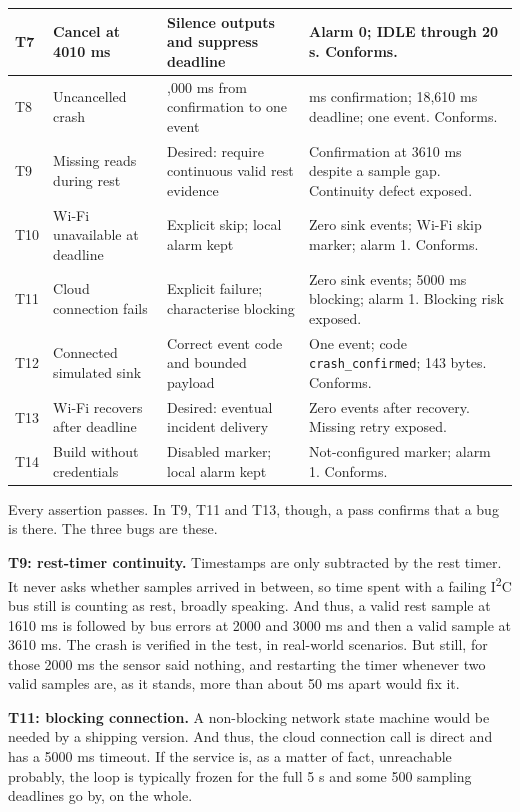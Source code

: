 \documentclass[10pt,a4paper]{article}
\begin{document}
\begin{longtable}{|>{\raggedright\arraybackslash}p{.05\linewidth}|>{\raggedright\arraybackslash}p{.21\linewidth}|>{\raggedright\arraybackslash}p{.28\linewidth}|>{\raggedright\arraybackslash}p{.35\linewidth}|}
T7 & Cancel at 4010 ms & Silence outputs and suppress deadline & Alarm 0; IDLE through 20 s. Conforms.\\\hline
T8 & Uncancelled crash & 15,000 ms from confirmation to one event & 3610 ms confirmation; 18,610 ms deadline; one event. Conforms.\\\hline
T9 & Missing reads during rest & Desired: require continuous valid rest evidence & Confirmation at 3610 ms despite a sample gap. Continuity defect exposed.\\\hline
T10 & Wi-Fi unavailable at deadline & Explicit skip; local alarm kept & Zero sink events; Wi-Fi skip marker; alarm 1. Conforms.\\\hline
T11 & Cloud connection fails & Explicit failure; characterise blocking & Zero sink events; 5000 ms blocking; alarm 1. Blocking risk exposed.\\\hline
T12 & Connected simulated sink & Correct event code and bounded payload & One event; code \texttt{crash\_confirmed}; 143 bytes. Conforms.\\\hline
T13 & Wi-Fi recovers after deadline & Desired: eventual incident delivery & Zero events after recovery. Missing retry exposed.\\\hline
T14 & Build without credentials & Disabled marker; local alarm kept & Not-configured marker; alarm 1. Conforms.\\\hline
\end{longtable}
\normalsize

Every assertion passes. In T9, T11 and T13, though, a pass confirms that a bug is there. The three bugs are these.

\textbf{T9: rest-timer continuity.} Timestamps are only subtracted by the rest timer. It never asks whether samples arrived in between, so time spent with a failing I\textsuperscript{2}C bus still is counting as rest, broadly speaking. And thus, a valid rest sample at 1610 ms is followed by bus errors at 2000 and 3000 ms and then a valid sample at 3610 ms. The crash is verified in the test, in real-world scenarios. But still, for those 2000 ms the sensor said nothing, and restarting the timer whenever two valid samples are, as it stands, more than about 50 ms apart would fix it.

\textbf{T11: blocking connection.} A non-blocking network state machine would be needed by a shipping version. And thus, the cloud connection call is direct and has a 5000 ms timeout. If the service is, as a matter of fact, unreachable probably, the loop is typically frozen for the full 5 s and some 500 sampling deadlines go by, on the whole.
\end{document}
